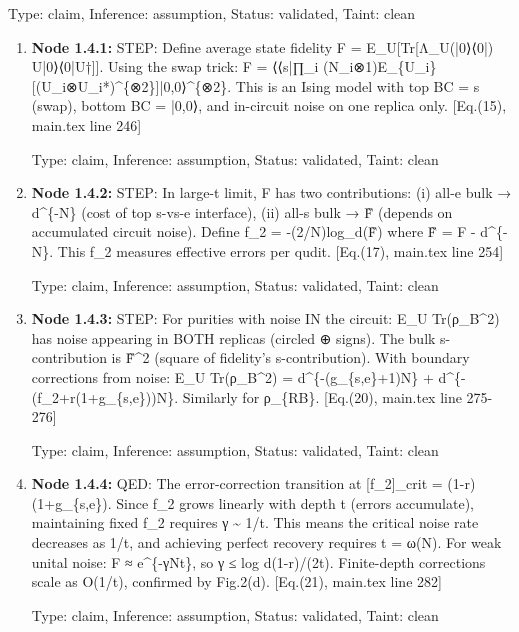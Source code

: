 \documentclass{article}
\begin{document}
\begin{enumerate}
  Type: claim, Inference: assumption, Status: validated, Taint: clean

\begin{enumerate}
\item \textbf{Node 1.4.1:} STEP: Define average state fidelity F = E\_U[Tr[Λ\_U(|0⟩⟨0|) U|0⟩⟨0|U†]]. Using the swap trick: F = ⟨⟨s|∏\_i (N\_i⊗1)E\_\{U\_i\}[(U\_i⊗U\_i*)\textasciicircum{}\{⊗2\}]|0,0⟩\textasciicircum{}\{⊗2\}. This is an Ising model with top BC = s (swap), bottom BC = |0,0⟩, and in-circuit noise on one replica only. [Eq.(15), main.tex line 246]

  Type: claim, Inference: assumption, Status: validated, Taint: clean

\item \textbf{Node 1.4.2:} STEP: In large-t limit, F has two contributions: (i) all-e bulk → d\textasciicircum{}\{-N\} (cost of top s-vs-e interface), (ii) all-s bulk → F̃ (depends on accumulated circuit noise). Define f\_2 = -(2/N)log\_d(F̃) where F̃ = F - d\textasciicircum{}\{-N\}. This f\_2 measures effective errors per qudit. [Eq.(17), main.tex line 254]

  Type: claim, Inference: assumption, Status: validated, Taint: clean

\item \textbf{Node 1.4.3:} STEP: For purities with noise IN the circuit: E\_U Tr(ρ\_B\textasciicircum{}2) has noise appearing in BOTH replicas (circled ⊕ signs). The bulk s-contribution is F̃\textasciicircum{}2 (square of fidelity's s-contribution). With boundary corrections from noise: E\_U Tr(ρ\_B\textasciicircum{}2) = d\textasciicircum{}\{-(g\_\{s,e\}+1)N\} + d\textasciicircum{}\{-(f\_2+r(1+g\_\{s,e\}))N\}. Similarly for ρ\_\{RB\}. [Eq.(20), main.tex line 275-276]

  Type: claim, Inference: assumption, Status: validated, Taint: clean

\item \textbf{Node 1.4.4:} QED: The error-correction transition at [f\_2]\_crit = (1-r)(1+g\_\{s,e\}). Since f\_2 grows linearly with depth t (errors accumulate), maintaining fixed f\_2 requires γ \textasciitilde{} 1/t. This means the critical noise rate decreases as 1/t, and achieving perfect recovery requires t = ω(N). For weak unital noise: F ≈ e\textasciicircum{}\{-γNt\}, so γ ≤ log d(1-r)/(2t). Finite-depth corrections scale as O(1/t), confirmed by Fig.2(d). [Eq.(21), main.tex line 282]

  Type: claim, Inference: assumption, Status: validated, Taint: clean


\end{enumerate}
\end{enumerate}
\end{document}
